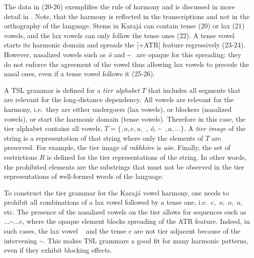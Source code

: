 The data in (20-26) exemplifies the rule of harmony and is discussed in more detail in \citep{Ribeiro2002}.
Note, that the harmony is reflected in the transcriptions and not in the orthography of the language.
Stems in Karaj\'a can contain tense (20) or lax (21) vowels, and the lax vowels can only follow the tense ones (22).
A tense vowel starts its harmonic domain and spreads the [+ATR] feature regressively (23-24).
However, nasalized vowels such as \emph{\~o} and \~\textschwa~ are opaque for this spreading: they do not enforce the agreement of the vowel thus allowing lax vowels to precede the nasal ones, even if a tense vowel follows it (25-26).

A TSL grammar is defined for a \emph{tier alphabet} $T$ that includes all segments that are relevant for the long-distance dependency.
All vowels are relevant for the harmony, i.e.\ they are either undergoers (lax vowels), or blockers (nasalized vowels), or start the harmonic domain (tense vowels).
Therefore in this case, the tier alphabet contains all vowels, $T = \{$\textepsilon$, o, e, u,$ \textopeno, \emph{\~o}, \~\textschwa~$, a, \dots\}$.
A \emph{tier image} of the string is a representation of that string where only the elements of $T$ are preserved.
For example, the tier image of \emph{rak\textopeno h\textopeno\texthtd\textepsilon k\~ore} is \emph{a\textopeno\textopeno\textepsilon\~oe}.
Finally, the set of restrictions $R$ is defined for the tier representations of the string.
In other words, the prohibited elements are the substrings that must not be observed in the tier representations of well-formed words of the language.

To construct the tier grammar for the Karaj\'a vowel harmony, one needs to prohibit all combinations of a lax vowel followed by a tense one, i.e.\ \textepsilon$e,$ \textepsilon$o,$ \textopeno$o,$ \textopeno$u$, etc.
The presence of the nasalized vowels on the tier allows for sequences such as \textepsilon$\dots$\~\textschwa$\dots e$, where the opaque element blocks spreading of the ATR feature.
Indeed, in such cases, the lax vowel \textepsilon~ and the tense  $e$ are not tier adjacent because of the intervening \~\textschwa.
This makes TSL grammars a good fit for many harmonic patterns, even if they exhibit blocking effects.



